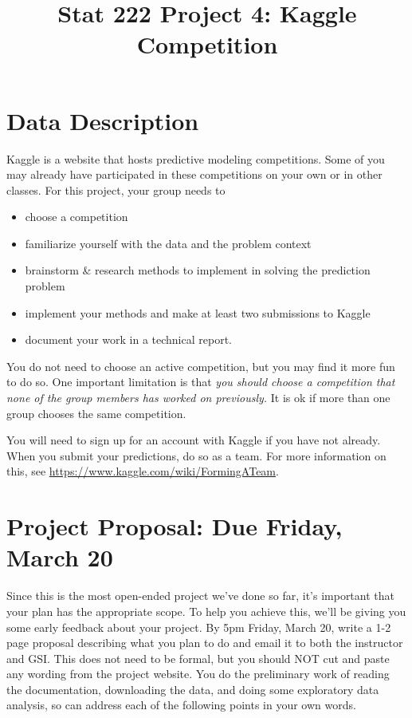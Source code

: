 \documentclass[11pt, oneside]{article}   	%
\title{Stat 222 Project 4: Kaggle Competition}
\date{}							%
\begin{document}
\maketitle

\section{Data Description}

Kaggle is a website that hosts predictive modeling competitions. Some of you may already have participated in these competitions on your own or in other classes. For this project, your group needs to 
\begin{itemize}
\item choose a competition
\item familiarize yourself with the data and the problem context
\item brainstorm \& research methods to implement in solving the prediction problem
\item implement your methods and make at least two submissions to Kaggle
\item document your work in a technical report.
\end{itemize}

You do not need to choose an active competition, but you may find it more fun to do so. One important limitation is that {\em you should choose a competition that none of the group members has worked on previously.} It is ok if more than one group chooses the same competition.

You will need to sign up for an account with Kaggle if you have not already. When you submit your predictions, do so as a team. For more information on this, see \url{https://www.kaggle.com/wiki/FormingATeam}.

\section{Project Proposal: Due Friday, March 20}

Since this is the most open-ended project we've done so far, it's important that your plan has the appropriate scope. To help you achieve this, we'll be giving you some early feedback about your project. By 5pm Friday, March 20, write a 1-2 page proposal describing what you plan to do and email it to both the instructor and GSI. This does not need to be formal, but you should NOT cut and paste any wording from the project website. You do the preliminary work of reading the documentation, downloading the data, and doing some exploratory data analysis, so can address each of the following points in your own words.
\end{document}
